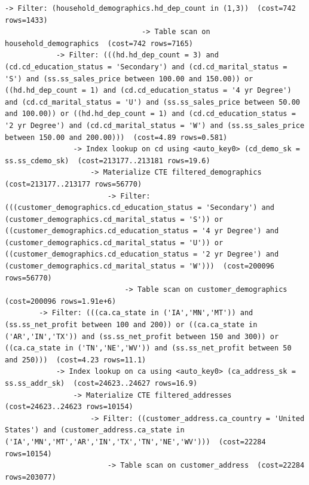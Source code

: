 \documentclass{ULBreport}
\begin{document}
\begin{lstlisting}[caption={Optimised \texttt{EXPLAIN FORMAT=TREE} on SF8 for Query 13}, label={lst:q13_explain_opt}, basicstyle=\ttfamily\scriptsize, breaklines=true, frame=single]
                            -> Filter: (household_demographics.hd_dep_count in (1,3))  (cost=742 rows=1433)
                                -> Table scan on household_demographics  (cost=742 rows=7165)
            -> Filter: (((hd.hd_dep_count = 3) and (cd.cd_education_status = 'Secondary') and (cd.cd_marital_status = 'S') and (ss.ss_sales_price between 100.00 and 150.00)) or ((hd.hd_dep_count = 1) and (cd.cd_education_status = '4 yr Degree') and (cd.cd_marital_status = 'U') and (ss.ss_sales_price between 50.00 and 100.00)) or ((hd.hd_dep_count = 1) and (cd.cd_education_status = '2 yr Degree') and (cd.cd_marital_status = 'W') and (ss.ss_sales_price between 150.00 and 200.00)))  (cost=4.89 rows=0.581)
                -> Index lookup on cd using <auto_key0> (cd_demo_sk = ss.ss_cdemo_sk)  (cost=213177..213181 rows=19.6)
                    -> Materialize CTE filtered_demographics  (cost=213177..213177 rows=56770)
                        -> Filter: (((customer_demographics.cd_education_status = 'Secondary') and (customer_demographics.cd_marital_status = 'S')) or ((customer_demographics.cd_education_status = '4 yr Degree') and (customer_demographics.cd_marital_status = 'U')) or ((customer_demographics.cd_education_status = '2 yr Degree') and (customer_demographics.cd_marital_status = 'W')))  (cost=200096 rows=56770)
                            -> Table scan on customer_demographics  (cost=200096 rows=1.91e+6)
        -> Filter: (((ca.ca_state in ('IA','MN','MT')) and (ss.ss_net_profit between 100 and 200)) or ((ca.ca_state in ('AR','IN','TX')) and (ss.ss_net_profit between 150 and 300)) or ((ca.ca_state in ('TN','NE','WV')) and (ss.ss_net_profit between 50 and 250)))  (cost=4.23 rows=11.1)
            -> Index lookup on ca using <auto_key0> (ca_address_sk = ss.ss_addr_sk)  (cost=24623..24627 rows=16.9)
                -> Materialize CTE filtered_addresses  (cost=24623..24623 rows=10154)
                    -> Filter: ((customer_address.ca_country = 'United States') and (customer_address.ca_state in ('IA','MN','MT','AR','IN','TX','TN','NE','WV')))  (cost=22284 rows=10154)
                        -> Table scan on customer_address  (cost=22284 rows=203077)


\end{lstlisting}
\end{document}
